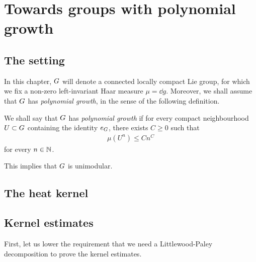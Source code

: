 \chapter{Towards groups with polynomial growth}

\section{The setting}

In this chapter,
$G$ will denote a connected locally compact Lie group,
for which we fix a non-zero left-invariant Haar measure $\mu = \dd g$.
Moreover,
we shall assume that $G$ has \emph{polynomial growth},
in the sense of the following definition.

\begin{definition}
    We shall say that $G$ has \emph{polynomial growth}
    if for every compact neighbourhood $U \subset G$
    containing the identity $e_G$,
    there exists $C \geq 0$ such that
    \begin{align*}
        \mu(U^n) \leq C n^C
    \end{align*}
    for every $n \in \mathbb{N}$.
\end{definition}

This implies that $G$ is unimodular.

\section{The heat kernel}

\section{Kernel estimates}

First,
let us lower the requirement that we need a Littlewood-Paley decomposition
to prove the kernel estimates.

